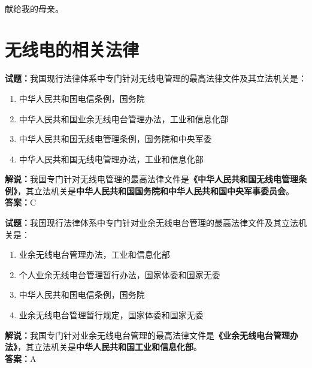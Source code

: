 \documentclass{ctexbook}
\newcommand{\reponame}{mike2718/ham}    %
\newcommand{\commiturl}{\url{https://github.com/\reponame/commit/\commithash}}
\begin{document}

\title{}
\author{\large \texttt{BG7XTQ}编著}
\date{\large{日期：\texttt{\today}}
  \vspace{15em}
  \\使用 
  \\编译自提交 \texttt{\commiturl}
}

\maketitle %

\thispagestyle{empty}
\vfil
\ \\
\vspace{15em}
\begin{center}
  {\Large 献给我的母亲。}
\end{center}

\newpage
\tableofcontents






\chapter{无线电的相关法律}

\newpage

\textbf{试题：}我国现行法律体系中专门针对无线电管理的最高法律文件及其立法机关是：
\begin{enumerate}[leftmargin=3em]
  \item 中华人民共和国电信条例，国务院
  \item 中华人民共和国业余无线电台管理办法，工业和信息化部
  \item 中华人民共和国无线电管理条例，国务院和中央军委
  \item 中华人民共和国无线电管理办法，工业和信息化部
\end{enumerate}
\noindent\textbf{解说：}我国专门针对无线电管理的最高法律文件是\textbf{《中华人民共和国无线电管理条例》}，其立法机关是\textbf{中华人民共和国国务院和中华人民共和国中央军事委员会}。\\\noindent\textbf{答案：}C

\vspace{1em}

\textbf{试题：}我国现行法律体系中专门针对业余无线电台管理的最高法律文件及其立法机关是：
\begin{enumerate}[leftmargin=3em]
  \item 业余无线电台管理办法，工业和信息化部
  \item 个人业余无线电台管理暂行办法，国家体委和国家无委
  \item 中华人民共和国电信条例，国务院
  \item 业余无线电台管理暂行规定，国家体委和国家无委
\end{enumerate}
\noindent\textbf{解说：}我国专门针对业余无线电台管理的最高法律文件是\textbf{《业余无线电台管理办法》}，其立法机关是\textbf{中华人民共和国工业和信息化部}。\\\noindent\textbf{答案：}A
\end{document}
